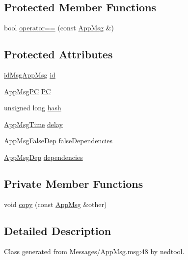 \subsection*{Protected Member Functions}
\begin{DoxyCompactItemize}
\item 
bool \hyperlink{class_app_msg_a5eb13ac34b1364ca33dbf8f563b9e81c}{operator==} (const \hyperlink{class_app_msg}{App\+Msg} \&)
\end{DoxyCompactItemize}
\subsection*{Protected Attributes}
\begin{DoxyCompactItemize}
\item 
\hyperlink{_app_msg__m_8h_a0bd5e3a5ba85ac1fa0fd0fae34d903c1}{id\+Msg\+App\+Msg} \hyperlink{class_app_msg_aadaa93732c4df84c8b2ef13d7199f9a1}{id}
\item 
\hyperlink{_app_msg__m_8h_abcd76636e4b750d033ffc348601dd7a2}{App\+Msg\+PC} \hyperlink{class_app_msg_a0dceb6642736a90673422df92ab3d788}{PC}
\item 
unsigned long \hyperlink{class_app_msg_a8b73e331d42d97d9e51603dc5352307f}{hash}
\item 
\hyperlink{_app_msg__m_8h_afd955b091e7d9b98cff80a090db1eb09}{App\+Msg\+Time} \hyperlink{class_app_msg_af7a10648a9051ad068c0b2660c7bb545}{delay}
\item 
\hyperlink{_app_msg__m_8h_a2b8cadfd13c916ddccf5a213ca34d8ee}{App\+Msg\+False\+Dep} \hyperlink{class_app_msg_a2e1c93236ae4ceb0fc5571a5b044c454}{false\+Dependencies}
\item 
\hyperlink{_app_msg__m_8h_a39bb58326d7e24febcd7397c022ada6a}{App\+Msg\+Dep} \hyperlink{class_app_msg_a6f78bb134b9a39321ad8093da19d8c8b}{dependencies}
\end{DoxyCompactItemize}
\subsection*{Private Member Functions}
\begin{DoxyCompactItemize}
\item 
void \hyperlink{class_app_msg_a2d5c5dacc13f5e7959467693cd0beda9}{copy} (const \hyperlink{class_app_msg}{App\+Msg} \&other)
\end{DoxyCompactItemize}


\subsection{Detailed Description}
Class generated from {\ttfamily Messages/\+App\+Msg.\+msg\+:48} by nedtool. 


